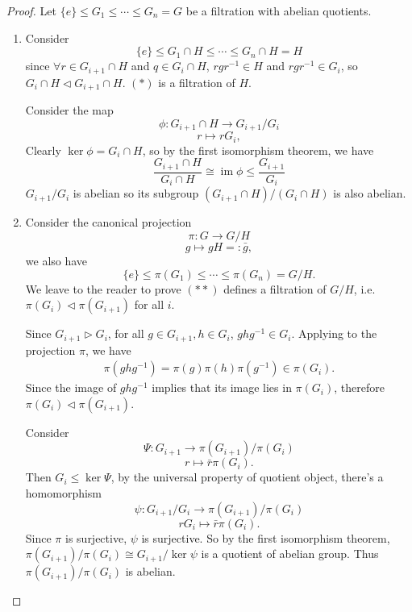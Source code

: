 \documentclass[11pt]{book}
\newcommand{\im}{\mathop{\mathrm{im}}}
\begin{document}
\begin{proof}
    Let $\{e\}\leq G_{1} \leq \cdots\leq  G_{n}=G$ be a filtration with abelian quotients. 
    \begin{enumerate}
        \item Consider 
        \[
        \{e\}\leq G_{1}\cap H\leq \cdots\leq G_{n}\cap H =H \tag{$*$}
        \] 
        since $\forall r\in G_{i+1}\cap H$ and $q\in G_{i}\cap H$, $rgr^{-1}\in H$ and $rgr^{-1} \in G_{i}$, so $G_{i}\cap H\lhd G_{i+1}\cap H$. $(*)$ is a filtration of $H$. 

        Consider the map 
        \[
        \phi:G_{i+1}\cap H\to G_{i+1} /G_{i}
        \]
        \[
        r\mapsto rG_{i},
        \]
        Clearly $\ker \phi=G_{i}\cap H$, so by the first isomorphism theorem, we have 
        \[
        \frac{G_{i+1}\cap H}{G_{i}\cap H}\cong \im \phi \leq \frac{G_{i+1}}{G_{i}}
        \]
        $G_{i+1} /G_{i}$ is abelian so its subgroup $(G_{i+1}\cap H) /(G_{i}\cap H)$ is also abelian. 

        \item Consider the canonical projection 
        \[
        \pi: G\to G /H
        \]
        \[
        g\mapsto gH =: \bar{g},
        \]
        we also have 
        \[
        \{e\}\leq \pi(G_{1})\leq \cdots \leq \pi(G_{n})=G /H. \tag{$**$}
        \]
        We leave to the reader to prove $(**)$ defines a filtration of $G /H$, i.e. $\pi(G_i) \lhd \pi(G_{i+1})$ for all $i$.

        Since \(G_{i+1} \rhd G_i\), for all \(g\in G_{i+1}, h \in G_i\), \(ghg^{-1} \in G_i\). Applying to the projection \(\pi\), we have
        \begin{align*}
            \pi(ghg^{-1}) = \pi(g) \pi(h) \pi(g^{-1}) \in \pi(G_i).
        \end{align*}
        Since the image of \(ghg^{-1}\) implies that its image lies in \(\pi(G_i)\), therefore \(\pi(G_i) \lhd \pi(G_{i+1})\).

        Consider 
        \[
        \Psi:G_{i+1}\to \pi(G_{i+1})/\pi(G_{i})
        \]
        \[
        r\mapsto \bar{r}\pi(G_{i}). 
        \]
        Then $G_{i}\leq \ker \Psi$, by the universal property of quotient object, there's a homomorphism 
        \[
        \psi:G_{i+1}/G_{i}\to \pi(G_{i+1})/\pi(G_{i})
        \]
        \[rG_{i}\mapsto \bar{r}\pi(G_{i}). \]
        Since $\pi$ is surjective, $\psi$ is surjective. So by the first isomorphism theorem, $\pi(G_{i+1}) /\pi(G_{i})\cong G_{i+1} /\ker \psi$ is a quotient of abelian group. Thus $\pi(G_{i+1}) /\pi(G_{i})$ is abelian.  
    \end{enumerate}
\end{proof}
\end{document}
